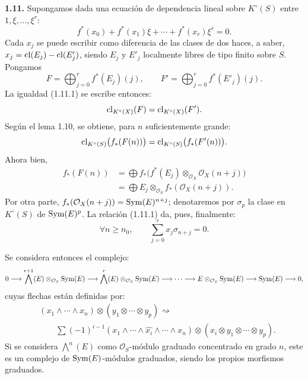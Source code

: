 \providecommand{\sisi}[2]{#2}

\textbf{1.11.} Supongamos dada una ecuación de dependencia lineal sobre \(K^\circ(S)\) entre \(1,\xi,\ldots,\xi^r\):
\begin{equation}\tag{1.11.1}
  f^*(x_0)+f^*(x_1)\xi+\cdots+f^*(x_r)\xi^r=0.
\end{equation}
Cada \(x_j\) se puede escribir como diferencia de las clases de dos haces, a saber, \(x_j=\operatorname{cl}(E_j)-\operatorname{cl}(E'_j)\), siendo \(E_j\) y \(E'_j\) localmente libres de tipo finito sobre \(S\). Pongamos
\[
  F=\bigoplus_{j=0}^r f^*(E_j)(j),
  \qquad
  F'=\bigoplus_{j=0}^r f^*(E'_j)(j).
\]
La igualdad (1.11.1) se escribe entonces:
\[
  \operatorname{cl}_{K^\circ(X)}(F)=\operatorname{cl}_{K^\circ(X)}(F').
\]
Según el lema 1.10, se obtiene, para \(n\) suficientemente grande:
\[
  \operatorname{cl}_{K^\circ(S)}\bigl(f_*(F(n))\bigr)=\operatorname{cl}_{K^\circ(S)}\bigl(f_*(F'(n))\bigr).
\]
Ahora bien,
\[
\begin{aligned}
  f_*(F(n))
  &=\bigoplus f_*\bigl(f^*(E_j)\otimes_{\mathcal O_X}\mathcal O_X(n+j)\bigr)\\
  &=\bigoplus E_j\otimes_{\mathcal O_S} f_*(\mathcal O_X(n+j)).
\end{aligned}
\]
Por otra parte, \(f_*(\mathcal O_X(n+j))=\operatorname{Sym}(E)^{n+j}\); denotaremos por \(\sigma_p\) la clase en \(K^\circ(S)\) de \(\operatorname{Sym}(E)^p\). La relación (1.11.1) da, pues, finalmente:
\begin{equation}\tag{1.11.2}
  \forall n\geq n_0,
  \qquad
  \sum_{j=0}^r x_j\sigma_{n+j}=0.
\end{equation}

Se considera entonces el complejo:
\[
  0\longrightarrow \bigwedge^{r+1}(E)\otimes_{\mathcal O_S}\operatorname{Sym}(E)
  \longrightarrow \bigwedge^r(E)\otimes_{\mathcal O_S}\operatorname{Sym}(E)
  \longrightarrow\cdots\longrightarrow
  E\otimes_{\mathcal O_S}\operatorname{Sym}(E)
  \longrightarrow \operatorname{Sym}(E)\longrightarrow0,
\]
cuyas flechas están definidas por:
\[
\begin{aligned}
&(x_1\wedge\cdots\wedge x_n)\otimes(y_1\otimes\cdots\otimes y_p)\rightsquigarrow{}\\
&\qquad \sum(-1)^{i-1}(x_1\wedge\cdots\wedge\widehat{x_i}\wedge\cdots\wedge x_n)
\otimes(x_i\otimes y_1\otimes\cdots\otimes y_p).
\end{aligned}
\]
Si se considera \(\bigwedge^n(E)\) como \(\mathcal O_S\)-módulo graduado concentrado en grado \(n\), este es un complejo de \(\operatorname{Sym}(E)\)-módulos graduados, siendo los propios morfismos graduados.

